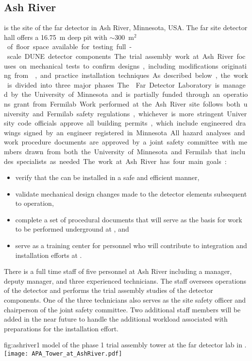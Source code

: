 \subsection{Ash River}

 is the site of the  far detector in Ash River,
Minnesota, USA. The  far site detector hall offers a \SI{16.75}{m} 
deep pit with $\sim$\SI{300}{m$^2$} of floor space available for 
testing full-scale DUNE detector components.  The trial assembly 
work at Ash River focuses on mechanical tests to confirm designs,
including modifications originating from , 
and practice installation techniques.  As described below, the 
work is divided into three major phases.  The  Far 
Detector Laboratory is managed by the University of Minnesota 
and is partially funded through an operations grant from 
Fermilab.  Work performed at the Ash River site follows both 
university and Fermilab safety regulations, whichever is more 
stringent. University code officials approve all building permits, 
which include engineered drawings signed by an engineer registered 
in Minnesota. All hazard analyses and work procedure documents are 
approved by a joint safety committee with members drawn from both 
the University of Minnesota and Fermilab that includes specialists 
as needed.

The work at Ash River has four main goals:
\begin{itemize}
  \item verify that the   can be installed 
    in a safe and efficient manner,
  \item validate mechanical design changes made to the detector
    elements subsequent to  operation,
  \item complete a set of procedural documents that will serve 
    as the basis for work to be performed underground at 
    , and 
  \item serve as a training center for personnel who will 
    contribute to  integration and installation 
    efforts at .
\end{itemize}

There is a full time staff of five personnel at Ash River including
a manager, deputy manager, and three experienced technicians.  The 
staff oversees operations of the  detector and performs 
the trial assembly studies of the  detector components.  
One of the three technicians also serves as the site safety officer 
and chairperson of the joint safety committee.  Two additional staff
members will be added in the near future to handle the additional 
workload associated with preparations for the  
installation effort.  
\begin{dunefigure}{fig:ashriver1}
  {\threed  model of the phase 1 trial assembly  tower at the  far detector lab in .}
  \texttt{[image: APA\_Tower\_at\_AshRiver.pdf]}
\end{dunefigure}

